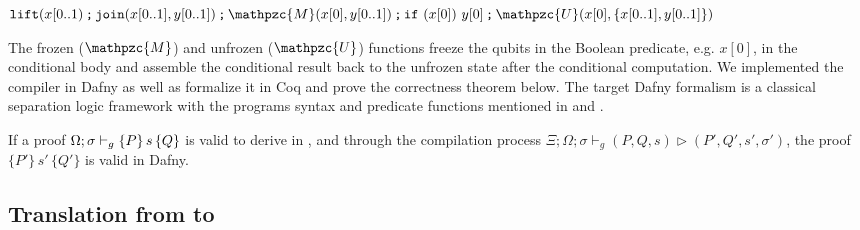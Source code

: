 {\footnotesize
\begin{center}
${\sseq{\texttt{lift}(x[0..1)}{\sseq{\texttt{join}(x[0..1],y[0..1])}{\sseq{\sseq{\mathpzc{M}(x[0],y[0..1])}{\sifq{x[0]}{y[0]}}}{\mathpzc{U}(x[0],\{x[0..1],y[0..1]\})}}}}$
\end{center}
}

The frozen ($\mathpzc{M}$) and unfrozen ($\mathpzc{U}$) functions freeze the qubits in the Boolean predicate, e.g. $x[0]$, in the conditional body and assemble the conditional result back to the unfrozen state after the conditional computation.
We implemented the compiler in Dafny as well as formalize it in Coq and prove the correctness theorem below. The target Dafny formalism is a classical separation logic framework \cite{separationlogic} with the \qafny programs syntax and predicate functions mentioned in  and .

\begin{theorem}\label{thm:proof-compile-dafny}\rm 
If a proof $\Omega;\sigma\vdash_{g}\{P\}\, s \,\{Q\}$ is valid to derive in \qafny, and through the compilation process $\Xi;\Omega;\sigma\vdash_g (P,Q,s) \triangleright (P',Q',s',\sigma')$, the proof $\{P'\} \, s' \,\{Q'\}$ is valid in Dafny.
\end{theorem}

\subsection{Translation from \qafny to \sqir}\label{sec:vqir-compilation}

\newcommand{\tget}{\texttt{get}}
\newcommand{\tstart}{\texttt{start}}
\newcommand{\tfst}{\texttt{fst}}
\newcommand{\tsnd}{\texttt{snd}}
\newcommand{\tucom}[1]{\texttt{ucom}~{#1}}
\newcommand{\tif}{\texttt{if}}
\newcommand{\tthen}{\texttt{then}}
\newcommand{\telse}{\texttt{else}}
\newcommand{\tlet}{\texttt{let}}
\newcommand{\tin}{\texttt{in}}

